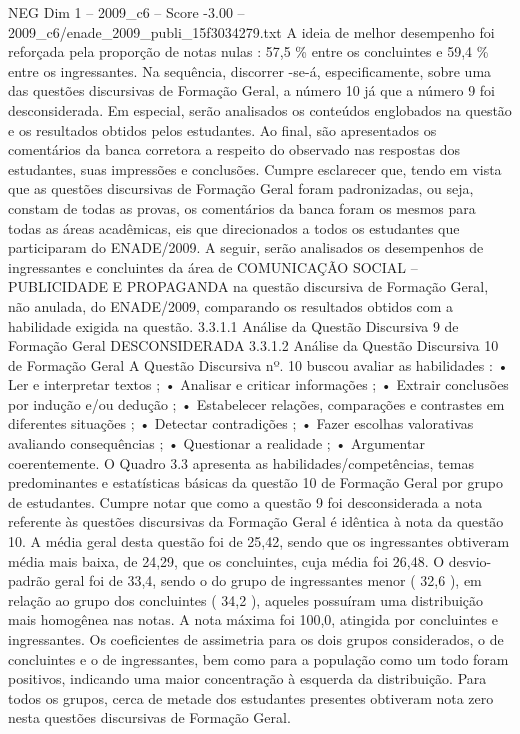 \begin{textsample}{NEG Dim 1 – 2009\_c6 – Score -3.00 – 2009\_c6/enade\_2009\_publi\_15f3034279.txt}
A ideia de melhor desempenho foi reforçada pela proporção de notas nulas : 57,5 \% entre os concluintes e 59,4 \% entre os ingressantes.
Na sequência, discorrer -se-á, especificamente, sobre uma das questões discursivas de Formação Geral, a número 10 já que a número 9 foi desconsiderada.
Em especial, serão analisados os conteúdos englobados na questão e os resultados obtidos pelos estudantes.
Ao final, são apresentados os comentários da banca corretora a respeito do observado nas respostas dos estudantes, suas impressões e conclusões.
Cumpre esclarecer que, tendo em vista que as questões discursivas de Formação Geral foram padronizadas, ou seja, constam de todas as provas, os comentários da banca foram os mesmos para todas as áreas acadêmicas, eis que direcionados a todos os estudantes que participaram do ENADE/2009.
A seguir, serão analisados os desempenhos de ingressantes e concluintes da área de COMUNICAÇÃO SOCIAL – PUBLICIDADE E PROPAGANDA na questão discursiva de Formação Geral, não anulada, do ENADE/2009, comparando os resultados obtidos com a habilidade exigida na questão. 3.3.1.1 Análise da Questão Discursiva 9 de Formação Geral DESCONSIDERADA 3.3.1.2 Análise da Questão Discursiva 10 de Formação Geral A Questão Discursiva nº. 10 buscou avaliar as habilidades : • Ler e interpretar textos ; • Analisar e criticar informações ; • Extrair conclusões por indução e/ou dedução ; • Estabelecer relações, comparações e contrastes em diferentes situações ; • Detectar contradições ; • Fazer escolhas valorativas avaliando consequências ; • Questionar a realidade ; • Argumentar coerentemente.
O Quadro 3.3 apresenta as habilidades/competências, temas predominantes e estatísticas básicas da questão 10 de Formação Geral por grupo de estudantes.
Cumpre notar que como a questão 9 foi desconsiderada a nota referente às questões discursivas da Formação Geral é idêntica à nota da questão 10.
A média geral desta questão foi de 25,42, sendo que os ingressantes obtiveram média mais baixa, de 24,29, que os concluintes, cuja média foi 26,48.
O desvio-padrão geral foi de 33,4, sendo o do grupo de ingressantes menor ( 32,6 ), em relação ao grupo dos concluintes ( 34,2 ), aqueles possuíram uma distribuição mais homogênea nas notas.
A nota máxima foi 100,0, atingida por concluintes e ingressantes.
Os coeficientes de assimetria para os dois grupos considerados, o de concluintes e o de ingressantes, bem como para a população como um todo foram positivos, indicando uma maior concentração à esquerda da distribuição.
Para todos os grupos, cerca de metade dos estudantes presentes obtiveram nota zero nesta questões discursivas de Formação Geral.

\end{textsample}
